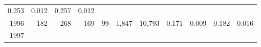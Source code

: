 \documentclass[]{article}
\begin{document}
\begin{longtable}[]{@{}rrrrrrrrrrr@{}}
\begin{minipage}[t]{0.09\columnwidth}
0.253\strut
\end{minipage} & \begin{minipage}[t]{0.05\columnwidth}\raggedleft\strut
0.012\strut
\end{minipage} & \begin{minipage}[t]{0.10\columnwidth}\raggedleft\strut
0.257\strut
\end{minipage} & \begin{minipage}[t]{0.04\columnwidth}\raggedleft\strut
0.012\strut
\end{minipage}\tabularnewline
\begin{minipage}[t]{0.06\columnwidth}\raggedleft\strut
1996\strut
\end{minipage} & \begin{minipage}[t]{0.07\columnwidth}\raggedleft\strut
182\strut
\end{minipage} & \begin{minipage}[t]{0.07\columnwidth}\raggedleft\strut
268\strut
\end{minipage} & \begin{minipage}[t]{0.07\columnwidth}\raggedleft\strut
169\strut
\end{minipage} & \begin{minipage}[t]{0.07\columnwidth}\raggedleft\strut
99\strut
\end{minipage} & \begin{minipage}[t]{0.07\columnwidth}\raggedleft\strut
1,847\strut
\end{minipage} & \begin{minipage}[t]{0.05\columnwidth}\raggedleft\strut
10,793\strut
\end{minipage} & \begin{minipage}[t]{0.09\columnwidth}\raggedleft\strut
0.171\strut
\end{minipage} & \begin{minipage}[t]{0.05\columnwidth}\raggedleft\strut
0.009\strut
\end{minipage} & \begin{minipage}[t]{0.10\columnwidth}\raggedleft\strut
0.182\strut
\end{minipage} & \begin{minipage}[t]{0.04\columnwidth}\raggedleft\strut
0.016\strut
\end{minipage}\tabularnewline
\begin{minipage}[t]{0.06\columnwidth}\raggedleft\strut
1997\strut
\end{minipage} & \begin{minipage}[t]{0.07\columnwidth}\raggedleft\strut

\end{minipage}
\end{longtable}
\end{document}
